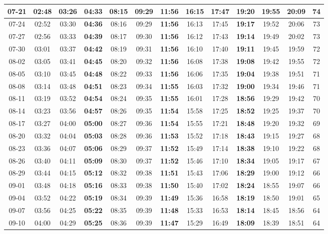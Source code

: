\begin{footnotesize}
\begin{longtable}{c | c | c | c | c | c | c | c | c | c | c | c | c}
		07-21&02:48&03:26&\textbf{04:33}&08:15&09:29&\textbf{11:56}&16:15&17:47&\textbf{19:20}&19:55&20:09&74\\\hline
		07-24&02:52&03:30&\textbf{04:36}&08:16&09:29&\textbf{11:56}&16:13&17:45&\textbf{19:17}&19:52&20:06&73\\\hline
		07-27&02:56&03:33&\textbf{04:39}&08:17&09:30&\textbf{11:56}&16:12&17:43&\textbf{19:14}&19:49&20:02&73\\\hline
		07-30&03:01&03:37&\textbf{04:42}&08:19&09:31&\textbf{11:56}&16:10&17:40&\textbf{19:11}&19:45&19:59&72\\\hline
		08-02&03:05&03:41&\textbf{04:45}&08:20&09:32&\textbf{11:56}&16:08&17:38&\textbf{19:08}&19:42&19:55&72\\\hline
		08-05&03:10&03:45&\textbf{04:48}&08:22&09:33&\textbf{11:56}&16:06&17:35&\textbf{19:04}&19:38&19:51&71\\\hline
		08-08&03:14&03:48&\textbf{04:51}&08:23&09:34&\textbf{11:55}&16:03&17:32&\textbf{19:00}&19:34&19:46&71\\\hline
		08-11&03:19&03:52&\textbf{04:54}&08:24&09:35&\textbf{11:55}&16:01&17:28&\textbf{18:56}&19:29&19:42&70\\\hline
		08-14&03:23&03:56&\textbf{04:57}&08:26&09:35&\textbf{11:54}&15:58&17:25&\textbf{18:52}&19:25&19:37&70\\\hline
		08-17&03:27&04:00&\textbf{05:00}&08:27&09:36&\textbf{11:54}&15:55&17:21&\textbf{18:48}&19:20&19:32&69\\\hline
		08-20&03:32&04:04&\textbf{05:03}&08:28&09:36&\textbf{11:53}&15:52&17:18&\textbf{18:43}&19:15&19:27&68\\\hline
		08-23&03:36&04:07&\textbf{05:06}&08:29&09:37&\textbf{11:52}&15:49&17:14&\textbf{18:38}&19:10&19:22&68\\\hline
		08-26&03:40&04:11&\textbf{05:09}&08:30&09:37&\textbf{11:52}&15:46&17:10&\textbf{18:34}&19:05&19:17&67\\\hline
		08-29&03:44&04:15&\textbf{05:12}&08:32&09:38&\textbf{11:51}&15:43&17:06&\textbf{18:29}&19:00&19:12&66\\\hline
		09-01&03:48&04:18&\textbf{05:16}&08:33&09:38&\textbf{11:50}&15:40&17:02&\textbf{18:24}&18:55&19:07&66\\\hline
		09-04&03:52&04:22&\textbf{05:19}&08:34&09:39&\textbf{11:49}&15:36&16:58&\textbf{18:19}&18:50&19:01&65\\\hline
		09-07&03:56&04:25&\textbf{05:22}&08:35&09:39&\textbf{11:48}&15:33&16:53&\textbf{18:14}&18:45&18:56&64\\\hline
		09-10&04:00&04:29&\textbf{05:25}&08:36&09:39&\textbf{11:47}&15:29&16:49&\textbf{18:09}&18:39&18:51&64\\\hline

\end{longtable}
\end{footnotesize}
